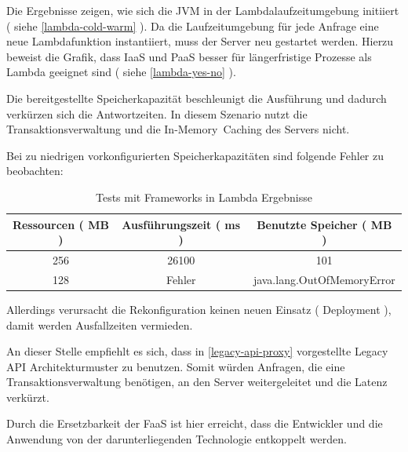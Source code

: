 \documentclass[
12pt,
english,
ngerman,
headsepline,
twoside,
openright,
numbers=noenddot,version=first
]{scrreprt}
\providecommand{\tabularnewline}{\\}
\begin{document}
Die Ergebnisse zeigen, wie sich die \acrshort{JVM} in der Lambdalaufzeitumgebung initiiert ( siehe \autoref{lambda-cold-warm} ). Da die Laufzeitumgebung für jede Anfrage eine neue Lambdafunktion instantiiert, muss der Server neu gestartet werden. Hierzu beweist die Grafik, dass \acrshort{IaaS} und \acrshort{PaaS} besser für längerfristige Prozesse als Lambda geeignet sind ( siehe \autoref{lambda-yes-no} ). 

Die bereitgestellte Speicherkapazität beschleunigt die Ausführung und dadurch verkürzen sich die Antwortzeiten. In diesem Szenario nutzt die Transaktionsverwaltung und die \glqq In-Memory\grqq\ Caching des Servers nicht.

Bei zu niedrigen vorkonfigurierten Speicherkapazitäten sind folgende Fehler zu beobachten:

\begin{table}[h]
	\centering{}
	\begin{tabular}{ccc}
		\noalign{\vskip\doublerulesep}
		Ressourcen ( MB ) & Ausführungszeit ( ms ) & Benutzte Speicher ( MB ) \tabularnewline[\doublerulesep]
		\hline
		\noalign{\vskip\doublerulesep}
		256 & 26100 & 101 \tabularnewline[\doublerulesep]
		\noalign{\vskip\doublerulesep}
		\noalign{\vskip\doublerulesep}
		128 & Fehler & java.lang.OutOfMemoryError \tabularnewline[\doublerulesep]
	\end{tabular}\label{lambda-out-of-memory}
\caption{Tests mit Frameworks in Lambda Ergebnisse}
\end{table}

Allerdings verursacht die Rekonfiguration keinen neuen Einsatz ( Deployment ), damit werden Ausfallzeiten vermieden. 

An dieser Stelle empfiehlt es sich, dass in \autoref{legacy-api-proxy} vorgestellte Legacy API Architekturmuster zu benutzen. Somit würden Anfragen, die eine Transaktionsverwaltung benötigen, an den Server weitergeleitet und die Latenz verkürzt.

Durch die Ersetzbarkeit der \acrshort{FaaS} ist hier erreicht, dass die Entwickler und die Anwendung von der darunterliegenden Technologie entkoppelt werden.%
 
\end{document}
